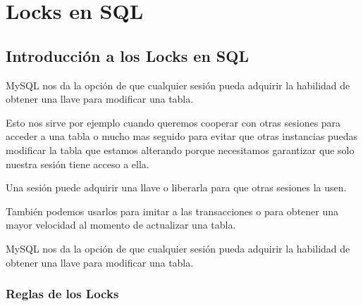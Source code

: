 \documentclass[12pt, fleqn]{report}                             %
\begin{document}
    \clearpage
    \chapter{Locks en SQL}


        \clearpage
        \section{Introducción a los Locks en SQL}

            MySQL nos da la opción de que cualquier sesión pueda adquirir la habilidad de obtener una llave
            para modificar una tabla.

            Esto nos sirve por ejemplo cuando queremos cooperar con otras sesiones para acceder a una tabla
            o mucho mas seguido para evitar que otras instancias puedas modificar la tabla que estamos alterando
            porque necesitamos garantizar que solo nuestra sesión tiene acceso a ella.

            Una sesión puede adquirir una llave o liberarla para que otras sesiones la usen.

            También podemos usarlos para imitar a las transacciones o para obtener una mayor velocidad al momento
            de actualizar una tabla.

            MySQL nos da la opción de que cualquier sesión pueda adquirir la habilidad de obtener una llave
            para modificar una tabla.


            \subsection{Reglas de los Locks}
\end{document}
